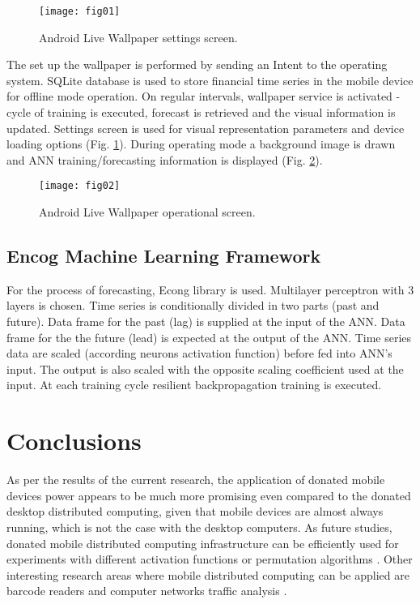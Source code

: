 ﻿\documentclass{llncs}
\begin{document}
\begin{figure}[h]
  \centering
  \texttt{[image: fig01]}
  \caption{Android Live Wallpaper settings screen.}
\label{fig:01}
\end{figure}

The set up the wallpaper is performed by sending an Intent to the operating system. SQLite database is used to store financial time series in the mobile device for offline mode operation. On regular intervals, wallpaper service is activated - cycle of training is executed, forecast is retrieved and the visual information is updated. Settings screen is used for visual representation parameters and device loading options (Fig. \ref{fig:01}). During operating mode a background image is drawn and ANN training/forecasting information is displayed (Fig. \ref{fig:02}). 

\begin{figure}[h]
  \centering
  \texttt{[image: fig02]}
  \caption{Android Live Wallpaper operational screen.}
\label{fig:02}
\end{figure}

\subsection{Encog Machine Learning Framework}

For the process of forecasting, Econg library is used. Multilayer perceptron with 3 layers is chosen. Time series is conditionally divided in two parts (past and future). Data frame for the past (lag) is supplied at the input of the ANN. Data frame for the the future (lead) is expected at the output of the ANN. Time series data are scaled (according neurons activation function) before fed into ANN's input. The output is also scaled with the opposite scaling coefficient used at the input. At each training cycle resilient backpropagation training is executed. 

\section{Conclusions}

As per the results of the current research, the application of donated mobile devices power appears to be much more promising even compared to the donated desktop distributed computing, given that mobile devices are almost always running, which is not the case with the desktop computers. As future studies, donated mobile distributed computing infrastructure can be efficiently used for experiments with different activation functions \cite{zankinski01} or permutation algorithms \cite{zankinski02}. Other interesting research areas where mobile distributed computing can be applied are barcode readers \cite{atanasova02} and computer networks traffic analysis \cite{tashev01,tashev02}.
\end{document}
